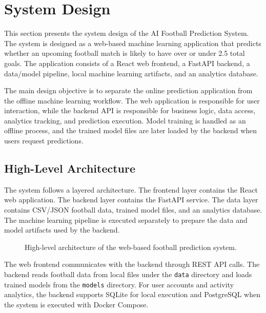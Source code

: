 \section{System Design}
\label{sec:system-design}

This section presents the system design of the AI Football Prediction System. The system is designed as a web-based machine learning application that predicts whether an upcoming football match is likely to have over or under 2.5 total goals. The application consists of a React web frontend, a FastAPI backend, a data/model pipeline, local machine learning artifacts, and an analytics database.

The main design objective is to separate the online prediction application from the offline machine learning workflow. The web application is responsible for user interaction, while the backend API is responsible for business logic, data access, analytics tracking, and prediction execution. Model training is handled as an offline process, and the trained model files are later loaded by the backend when users request predictions.

\subsection{High-Level Architecture}
\label{subsec:high-level-architecture}

The system follows a layered architecture. The frontend layer contains the React web application. The backend layer contains the FastAPI service. The data layer contains CSV/JSON football data, trained model files, and an analytics database. The machine learning pipeline is executed separately to prepare the data and model artifacts used by the backend.

\begin{figure}[htbp]
    \centering
    \caption{High-level architecture of the web-based football prediction system.}
    \label{fig:system-architecture}
\end{figure}

The web frontend communicates with the backend through REST API calls. The backend reads football data from local files under the \texttt{data} directory and loads trained models from the \texttt{models} directory. For user accounts and activity analytics, the backend supports SQLite for local execution and PostgreSQL when the system is executed with Docker Compose.

